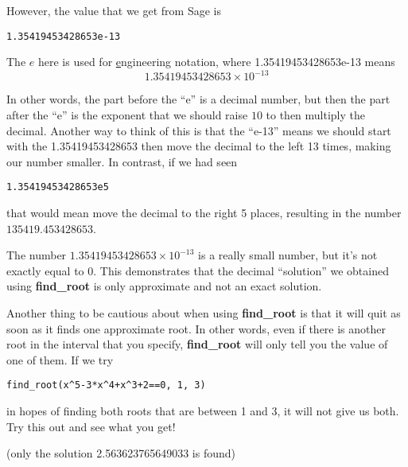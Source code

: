 However, the value that we get from Sage is

\begin{verbatim}
1.35419453428653e-13
\end{verbatim}

The $e$ here is used for \underline{e}ngineering notation,
where 1.35419453428653e-13 means
\begin{equation*}
1.35419453428653\times 10^{-13}
\end{equation*}

In other words, the part before the ``e'' is a decimal number,
but then the part after the ``e'' is the exponent that we should
raise $10$ to then multiply the decimal. Another way to think of
this is that the ``e-13'' means we should start with the
1.35419453428653 then move the decimal to the left 13 times,
making our number smaller. In contrast, if we had seen

\begin{verbatim}1.35419453428653e5\end{verbatim}

that would mean move the decimal to the right 5 places, resulting
in the number $135419.453428653$.

The number $1.35419453428653\times 10^{-13}$ is a really
small number, but it's not exactly equal to 0. This 
demonstrates that the decimal ``solution'' we obtained using
\textbf{find\_root} is only approximate and not an exact solution.

Another thing to be cautious about when using \textbf{find\_root}
is that it will quit as soon as it finds one approximate root. In other
words, even if there is another root in the interval that you specify,
\textbf{find\_root} will only tell you the value of one of them. If we
try

\begin{verbatim}
find_root(x^5-3*x^4+x^3+2==0, 1, 3)
\end{verbatim}

in hopes of finding both roots that are between 1 and 3, it will not
give us both. Try this out and see what you get!

(only the solution 2.563623765649033 is found)
